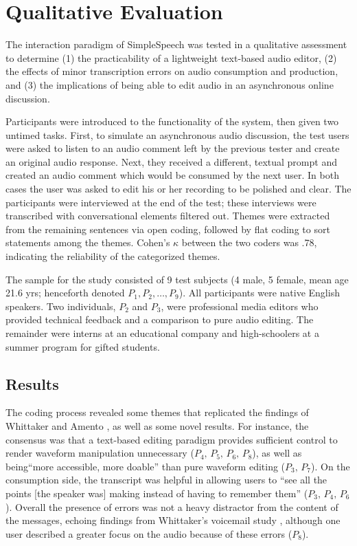 \section{Qualitative Evaluation}

The interaction paradigm of SimpleSpeech was tested in a qualitative assessment to determine (1) the practicability of a lightweight text-based audio editor, (2) the effects of minor transcription errors on audio consumption and production, and (3) the implications of being able to edit audio in an asynchronous online discussion.

Participants were introduced to the functionality of the system, then given two untimed tasks. 
First, to simulate an asynchronous audio discussion, the test users were asked to listen to an audio comment left by the previous tester and create an original audio response. 
Next, they received a different, textual prompt and created an audio comment which would be consumed by the next user. 
In both cases the user was asked to edit his or her recording to be polished and clear.
The participants were interviewed at the end of the test; these interviews were transcribed with conversational elements filtered out.
Themes were extracted from the remaining sentences via open coding, followed by flat coding to sort statements among the themes. 
Cohen's $\kappa$ between the two coders was .78, indicating the reliability of the categorized themes.

The sample for the study consisted of 9 test subjects (4 male, 5 female, mean age 21.6 yrs; henceforth denoted $P_1, P_2, \ldots, P_9$). 
All participants were native English speakers. 
Two individuals, $P_2$ and $P_3$, were professional media editors who provided technical feedback and a comparison to pure audio editing.
The remainder were interns at an educational company and high-schoolers at a summer program for gifted students.

\subsection{Results}
The coding process revealed some themes that replicated the findings of Whittaker and Amento \cite{whittaker_semantic}, as well as some novel results.
For instance, the consensus was that a text-based editing paradigm provides sufficient control to render waveform manipulation unnecessary ($P_4,\,P_5,\,P_6,\,P_8$), as well as being``more accessible, more doable'' than pure waveform editing ($P_3,\,P_7$).
On the consumption side, the transcript was helpful in allowing users to ``see all the points [the speaker was] making instead of having to remember them'' ($P_3,\,P_4,\,P_6$).
Overall the presence of errors was not a heavy distractor from the content of the messages, echoing findings from Whittaker's voicemail study \cite{whittaker}, although one user described a greater focus on the audio because of these errors ($P_8$).


